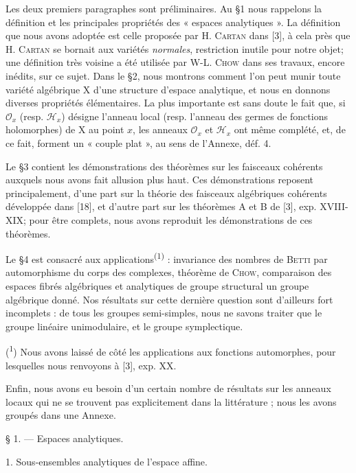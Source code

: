 Les deux premiers paragraphes sont préliminaires. Au \S 1 nous rappelons la définition et les principales propriétés des « espaces analytiques ». La définition que nous avons adoptée est celle proposée par H. \textsc{Cartan} dans [3], à cela près que H. \textsc{Cartan} se bornait aux variétés \textit{normales}, restriction inutile pour notre objet; une définition très voisine a été utilisée par W-L. \textsc{Chow} dans ses travaux, encore inédits, sur ce sujet. Dans le \S 2, nous montrons comment l'on peut munir toute variété algébrique $\mathrm{X}$ d'une structure d'espace analytique, et nous en donnons diverses propriétés élémentaires. La plus importante est sans doute le fait que, si $\mathcal{O}_x$ (resp. $\mathcal{H}_x$) désigne l'anneau local (resp. l'anneau des germes de fonctions holomorphes) de $\mathrm{X}$ au point $x$, les anneaux $\mathcal{O}_x$ et $\mathcal{H}_x$ ont même complété, et, de ce fait, forment un « couple plat », au sens de l'Annexe, déf. 4.

Le \S 3 contient les démonstrations des théorèmes sur les faisceaux cohérents auxquels nous avons fait allusion plus haut. Ces démonstrations reposent principalement, d'une part sur la théorie des faisceaux algébriques cohérents développée dans [18], et d'autre part sur les théorèmes A et B de [3], exp. XVIII-XIX; pour être complets, nous avons reproduit les démonstrations de ces théorèmes.

Le \S 4 est consacré aux applications\textsuperscript{(1)} : invariance des nombres de \textsc{Betti} par automorphisme du corps des complexes, théorème de \textsc{Chow}, comparaison des espaces fibrés algébriques et analytiques de groupe structural un groupe algébrique donné. Nos résultats sur cette dernière question sont d'ailleurs fort incomplets : de tous les groupes semi-simples, nous ne savons traiter que le groupe linéaire unimodulaire, et le groupe symplectique.

(\textsuperscript{1}) Nous avons laissé de côté les applications aux fonctions automorphes, pour lesquelles nous renvoyons à [3], exp. XX.



Enfin, nous avons eu besoin d'un certain nombre de résultats sur les anneaux locaux qui ne se trouvent pas explicitement dans la littérature ; nous les avons groupés dans une Annexe.


§ 1. — Espaces analytiques.


1. Sous-ensembles analytiques de l'espace affine.


